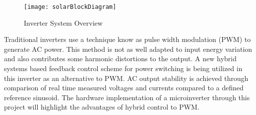 \begin{figure}
\centering
\texttt{[image: solarBlockDiagram]}
\caption{Inverter System Overview}
\label{solarBlock}
\end{figure}

Traditional inverters use a technique know as pulse width modulation (PWM) to generate AC power. This method is not as well adapted to input energy variation and also contributes some harmonic distortions to the output. A new hybrid systems based feedback control scheme for power switching is being utilized in this inverter as an alternative to PWM. AC output stability is achieved through comparison of real time measured voltages and currents compared to a defined reference sinusoid.\cite{ricardo} The hardware implementation  of a microinverter through this project will highlight the advantages of hybrid control to PWM.





